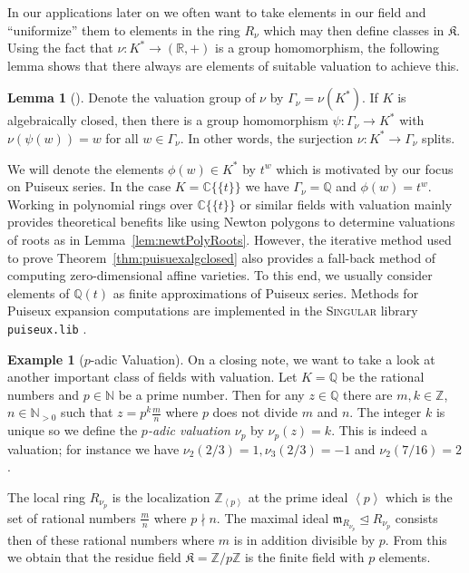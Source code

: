 \documentclass[
  paper=a4,
  titlepage,
  bibliography=totoc,
  pagesize=pdftex
]{scrartcl}
\numberwithin{figure}{section}
\numberwithin{equation}{section}
\numberwithin{table}{section}
\newcommand*\setZ{\mathds{Z}}
\newcommand*\setR{\mathds{R}}
\newcommand*\setC{\mathds{C}}
\newcommand*\setQ{\mathds{Q}}
\newcommand*\setN{\mathds{N}}
\newcommand*\ideal[1]{\left\langle #1 \right\rangle}
\newcommand*\puiseux[2]{#1\{\!\{#2\}\!\}}
\newcommand*\CCt{\puiseux{\setC}{t}}
\let\idealof\trianglelefteq
\theoremstyle{definition}
\newtheorem{example}[definition]{Example}
\newtheorem{lemma}[definition]{Lemma}
\numberwithin{definition}{section}
\begin{document}
In our applications later on we often want to take elements in our field and
\enquote{uniformize} them to elements in the ring $R_{\nu}$ which may then define classes
in $\mathfrak K$. Using the fact that $\nu : K^* \to (\setR, +)$ is a group homomorphism,
the following lemma shows that there always are elements of suitable valuation to achieve
this.

\begin{lemma}[{\cite[Lemma~2.1.15]{sturmMacTrop}}]
  \label{lem:valSplit}
  Denote the valuation group of $\nu$ by $\Gamma_\nu = \nu(K^*)$. If $K$ is algebraically
  closed, then there is a group homomorphism $\psi : \Gamma_\nu \to K^*$ with
  $\nu(\psi(w)) = w$ for all $w \in \Gamma_\nu$. In other words, the surjection $\nu : K^*
  \to \Gamma_\nu$ splits.
\end{lemma}

We will denote the elements $\phi(w) \in K^*$ by $t^w$ which is motivated by our focus on
Puiseux series. In the case $K = \CCt$ we have $\Gamma_\nu = \setQ$ and $\phi(w) = t^w$.
Working in polynomial rings over $\CCt$ or similar fields with valuation mainly provides
theoretical benefits like using Newton polygons to determine valuations of roots as in
Lemma~\ref{lem:newtPolyRoots}. However, the iterative method used to prove
Theorem~\ref{thm:puisuexalgclosed} also provides a fall-back method of computing
zero-dimensional affine varieties. To this end, we usually consider elements of $\setQ(t)$
as finite approximations of Puiseux series. Methods for Puiseux expansion computations are
implemented in the \textsc{Singular} library \texttt{puiseux.lib} \cite{puiseuxLib}.

\begin{example}[$p$-adic Valuation] \label{ex:pAdic}
  On a closing note, we want to take a look at another important class of fields with
  valuation. Let $K = \setQ$ be the rational numbers and $p\in \setN$ be a prime number.
  Then for any $z \in \setQ$ there are $m, k \in \setZ$, $n \in \setN_{>0}$ such that $z =
  p^k \frac mn$ where $p$ does not divide $m$ and $n$. The integer $k$ is unique so we
  define the \emph{$p$-adic valuation $\nu_p$} by $\nu_p(z) = k$. This is indeed a
  valuation; for instance we have $\nu_2(2/3) = 1, \nu_3(2/3)=-1$ and $\nu_2(7/16)=2$.

  The local ring $R_{\nu_p}$ is the localization $\setZ_{\ideal p}$ at the prime ideal
  $\ideal p$ which is the set of rational numbers $\frac mn$ where $p \nmid n$. The
  maximal ideal $\mathfrak m_{R_{\nu_p}} \idealof R_{\nu_p}$ consists then of these
  rational numbers where $m$ is in addition divisible by $p$. From this we obtain that
  the residue field $\mathfrak K = \setZ/p\setZ$ is the finite field with $p$ elements.
\end{example}
\end{document}
